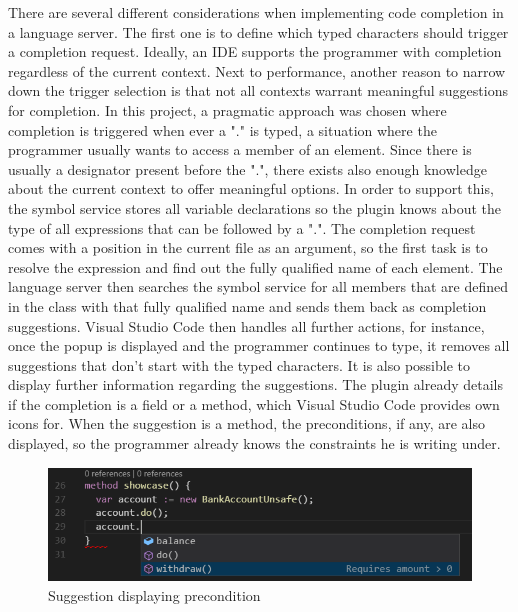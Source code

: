  There are several different considerations when implementing code completion in a language server. The first one is to define which typed characters should trigger a completion request. Ideally, an IDE supports the programmer with completion regardless of the current context. Next to performance, another reason to narrow down the trigger selection is that not all contexts warrant meaningful suggestions for completion. In this project, a pragmatic approach was chosen where completion is triggered when ever a "." is typed, a situation where the programmer usually wants to access a member of an element. Since there is usually a designator present before the ".", there exists also enough knowledge about the current context to offer meaningful options. \newline
 In order to support this, the symbol service stores all variable declarations so the plugin knows about the type of all expressions that can be followed by a ".". The completion request comes with a position in the current file as an argument, so the first task is to resolve the expression and find out the fully qualified name of each element. The language server then searches the symbol service for all members that are defined in the class with that fully qualified name and sends them back as completion suggestions. \newline
 Visual Studio Code then handles all further actions, for instance, once the popup is displayed and the programmer continues to type, it removes all suggestions that don't start with the typed characters. It is also possible to display further information regarding the suggestions. The plugin already details if the completion is a field or a method, which Visual Studio Code provides own icons for. When the suggestion is a method, the preconditions, if any, are also displayed, so the programmer already knows the constraints he is writing under. \newline
 
 \begin{figure}[H]
	\centering
	\includegraphics[width=1\textwidth]{img/codeCompletionMethod}
	\caption{Suggestion displaying precondition}
	\label{fig:codecompletionmethod}
\end{figure}

